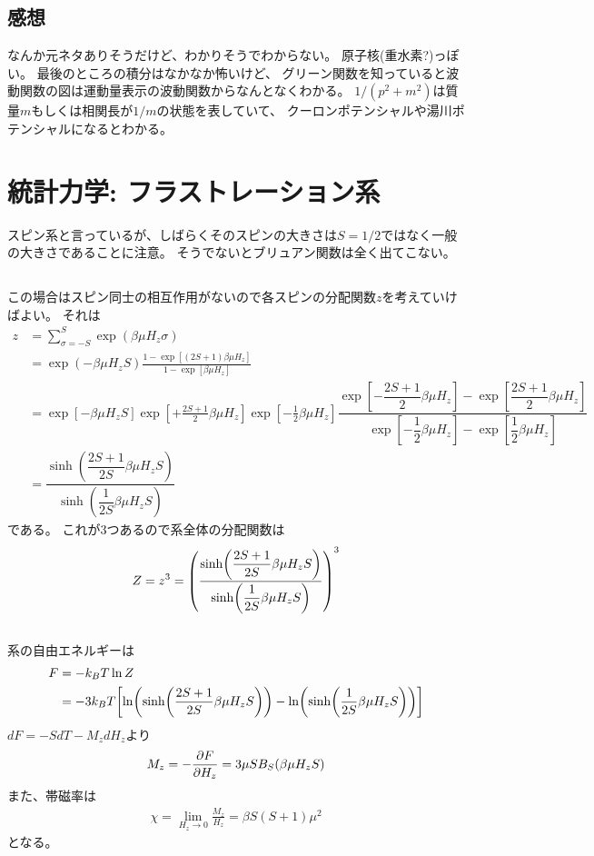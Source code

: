 \documentclass[../../master.tex]{subfiles}
\begin{document}
\subsection*{感想}
なんか元ネタありそうだけど、わかりそうでわからない。
原子核(重水素?)っぽい。
最後のところの積分はなかなか怖いけど、
グリーン関数を知っていると波動関数の図は運動量表示の波動関数からなんとなくわかる。
\(1/(p^2+m^2)\)は質量\(m\)もしくは相関長が\(1/m\)の状態を表していて、
クーロンポテンシャルや湯川ポテンシャルになるとわかる。

\clearpage
\section{統計力学: フラストレーション系}
スピン系と言っているが、しばらくそのスピンの大きさは\(S=1/2\)ではなく一般の大きさであることに注意。
そうでないとブリュアン関数は全く出てこない。
\subsection{}
この場合はスピン同士の相互作用がないので各スピンの分配関数\(z\)を考えていけばよい。
それは
\begin{align}
    z
    &= \sum_{\sigma=-S}^{S}\exp(\beta\mu H_z\sigma)\\
    &= \exp(-\beta\mu H_z S)\frac{1-\exp[(2S+1)\beta\mu H_z]}{1-\exp[\beta\mu H_z]}\\
    &= \exp[-\beta\mu H_z S]\exp[+\frac{2S+1}{2}\beta\mu H_z]\exp[-\frac{1}{2}\beta\mu H_z]
        \dfrac{\exp[-\dfrac{2S+1}{2}\beta\mu H_z]-\exp[\dfrac{2S+1}{2}\beta\mu H_z]}{\exp[-\dfrac{1}{2}\beta\mu H_z]-\exp[\dfrac{1}{2}\beta\mu H_z]}\\
    &=\dfrac{\sinh(\dfrac{2S+1}{2S}\beta\mu H_z S)}{\sinh(\dfrac{1}{2S}\beta\mu H_z S)}
\end{align}
である。
これが3つあるので系全体の分配関数は
\begin{align}
    Z = z^3 = \qty(\dfrac{\sinh(\dfrac{2S+1}{2S}\beta\mu H_z S)}{\sinh(\dfrac{1}{2S}\beta\mu H_z S)})^3
\end{align}

\subsection{}
系の自由エネルギーは
\begin{align}
    F &= -k_B T \ln Z\\
    &= -3k_B T \qty[\ln(\sinh(\dfrac{2S+1}{2S}\beta\mu H_z S))-\ln(\sinh(\dfrac{1}{2S}\beta\mu H_z S))]
\end{align}
\(dF = -S dT-M_z dH_z\)より
\begin{align}
    M_z = -\pdv{F}{H_z} = 3\mu S B_S(\beta\mu H_z S)
\end{align}
また、帯磁率は
\begin{align}
    \chi = \lim_{H_z\to 0} \frac{M_z}{H_z} = \beta S(S+1)\mu^2
\end{align}
となる。
\end{document}
